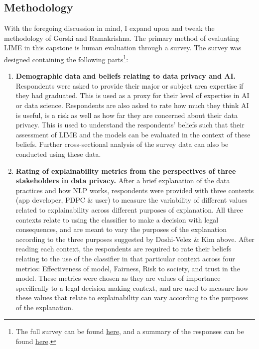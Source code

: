 \subsection{Methodology}
With the foregoing discussion in mind, I expand upon and tweak the methodology of Gorski and Ramakrishna. The primary method of evaluating LIME in this capstone is human evaluation through a survey. The survey was designed containing the following parts\footnote{The full survey can be found \href{https://github.com/TristanKoh/capstone-repo/blob/448263a933ae787027298e266f9202e7b3077524/survey/survey_questions.pdf}{here}, and a summary of the responses can be found \href{https://github.com/TristanKoh/capstone-repo/blob/448263a933ae787027298e266f9202e7b3077524/survey/survey_responses.pdf}{here}.}:
\begin{enumerate}
	\item \textbf{Demographic data and beliefs relating to data privacy and AI.} Respondents were asked to provide their major or subject area expertise if they had graduated. This is used as a proxy for their level of expertise in AI or data science. Respondents are also asked to rate how much they think AI is useful, is a risk as well as how far they are concerned about their data privacy. This is used to understand the respondents' beliefs such that their assessment of LIME and the models can be evaluated in the context of these beliefs. Further cross-sectional analysis of the survey data can also be conducted using these data.
	\item \textbf{Rating of explainability metrics from the perspectives of three stakeholders in data privacy.} After a brief explanation of the data practices and how NLP works, respondents were provided with three contexts (app developer, PDPC \& user) to measure the variability of different values related to explainability across different purposes of explanation. All three contexts relate to using the classifier to make a decision with legal consequences, and are meant to vary the purposes of the explanation according to the three purposes suggested by Doshi-Velez \& Kim above. After reading each context, the respondents are required to rate their beliefs relating to the use of the classifier in that particular context across four metrics: Effectiveness of model, Fairness, Risk to society, and trust in the model. These metrics were chosen as they are values of importance specifically to a legal decision making context, and are used to measure how these values that relate to explainability can vary according to the purposes of the explanation. 

\end{enumerate}
